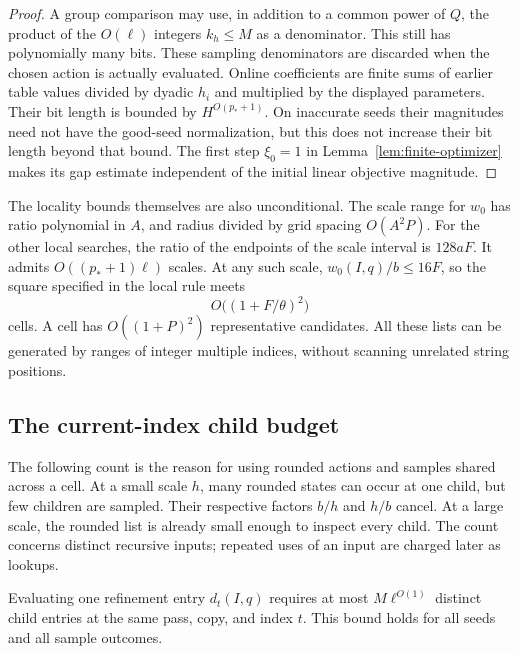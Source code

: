 \begin{proof}
A group comparison may use, in addition to a common power of $Q$,
the product of the $O(\ell)$ integers $k_h\le M$ as a denominator.
This still has polynomially many bits.  These sampling denominators
are discarded when the chosen action is actually evaluated.  Online
coefficients are finite sums of earlier table values divided by
dyadic $h_i$ and multiplied by the displayed parameters.  Their bit
length is bounded by $H^{O(p_*+1)}$.  On inaccurate seeds their
magnitudes need not have the good-seed normalization, but this does
not increase their bit length beyond that bound.  The first step
$\xi_0=1$ in Lemma~\ref{lem:finite-optimizer} makes its gap estimate
independent of the initial linear objective magnitude.
\end{proof}

The locality bounds themselves are also unconditional.  The scale
range for $w_0$ has ratio polynomial in $A$, and radius divided by
grid spacing $O(A^2P)$.  For the other local searches, the ratio of
the endpoints of the scale interval is $128aF$.  It admits
$O((p_*+1)\ell)$ scales.  At any such scale,
$w_0(I,q)/b\le16F$, so the square specified in the local rule meets
\[
 O\bigl((1+F/\theta)^2\bigr)
\]
cells.  A cell has $O((1+P)^2)$ representative candidates.  All these
lists can be generated by ranges of integer multiple indices,
without scanning unrelated string positions.

\subsection{The current-index child budget}

The following count is the reason for using rounded actions and
samples shared across a cell.  At a small scale $h$, many rounded
states can occur at one child, but few children are sampled.  Their
respective factors $b/h$ and $h/b$ cancel.  At a large scale, the
rounded list is already small enough to inspect every child.
The count concerns distinct recursive inputs; repeated uses of an
input are charged later as lookups.

\begin{lemma}
\label{lem:current-index-budget}
Evaluating one refinement entry $d_t(I,q)$ requires at most
$M\ell^{O(1)}$ distinct child entries at the same pass, copy, and
index $t$.  This bound holds for all seeds and all sample outcomes.
\end{lemma}

